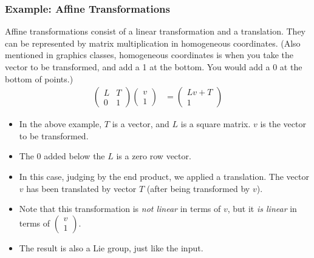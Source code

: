 \documentclass[10pt]{article}
\begin{document}
\subsubsection*{Example: Affine Transformations}
Affine transformations consist of a linear transformation and a translation.  They can be represented by matrix multiplication in homogeneous coordinates.  (Also mentioned in graphics classes, homogeneous coordinates is when you take the vector to be transformed, and add a 1 at the bottom.  You would add a 0 at the bottom of points.)
\begin{align*}
    \begin{pmatrix} L & T \\ 0 & 1 \end{pmatrix} \begin{pmatrix} v \\ 1 \end{pmatrix} &= \begin{pmatrix} Lv + T \\ 1 \end{pmatrix}
\end{align*}
\begin{itemize}
    \item In the above example, $T$ is a vector, and $L$ is a square matrix.  $v$ is the vector to be transformed.
    \item The $0$ added below the $L$ is a zero row vector. 
    \item In this case, judging by the end product, we applied a translation.  The vector $v$ has been translated by vector $T$ (after being transformed by $v$).
    \item Note that this transformation is \textit{not linear} in terms of $v$, but it \textit{is linear} in terms of $\begin{pmatrix} v \\ 1 \end{pmatrix}$.
    \item The result is also a Lie group, just like the input.
\end{itemize}
\end{document}
